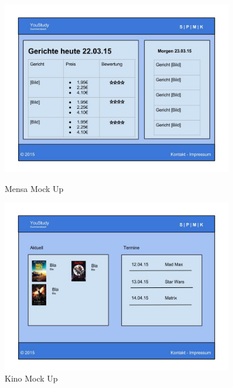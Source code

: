 \begin{figure}[ht]
\includegraphics[width=0.9\textwidth]{./img/Mensa}\caption{Mensa Mock Up}\label{fig3}
\includegraphics[width=0.9\textwidth]{./img/Kino}\caption{Kino Mock Up}\label{fig4}
\end{figure}
 
